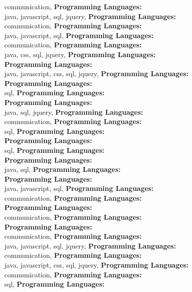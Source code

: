 communication, \textbf{Programming Languages:} \\
java, javascript, sql, jquery, \textbf{Programming Languages:} \\
communication, \textbf{Programming Languages:} \\
java, javascript, sql, \textbf{Programming Languages:} \\
communication, \textbf{Programming Languages:} \\
java, css, sql, jquery, \textbf{Programming Languages:} \\
\textbf{Programming Languages:} \\
java, javascript, css, sql, jquery, \textbf{Programming Languages:} \\
\textbf{Programming Languages:} \\
sql, \textbf{Programming Languages:} \\
\textbf{Programming Languages:} \\
java, sql, jquery, \textbf{Programming Languages:} \\
communication, \textbf{Programming Languages:} \\
sql, \textbf{Programming Languages:} \\
\textbf{Programming Languages:} \\
sql, \textbf{Programming Languages:} \\
\textbf{Programming Languages:} \\
java, sql, \textbf{Programming Languages:} \\
\textbf{Programming Languages:} \\
java, javascript, sql, \textbf{Programming Languages:} \\
communication, \textbf{Programming Languages:} \\
\textbf{Programming Languages:} \\
communication, \textbf{Programming Languages:} \\
\textbf{Programming Languages:} \\
communication, \textbf{Programming Languages:} \\
java, javascript, sql, jquery, \textbf{Programming Languages:} \\
communication, \textbf{Programming Languages:} \\
java, javascript, css, sql, jquery, \textbf{Programming Languages:} \\
communication, \textbf{Programming Languages:} \\
sql, \textbf{Programming Languages:} \\

